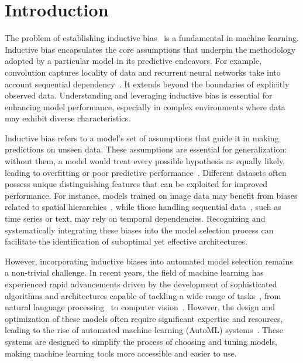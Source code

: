 \documentclass[14pt]{extarticle}
\begin{document}
\section{Introduction} 
The problem of establishing inductive bias~\citep{Mitchell2007TheNF} is a fundamental in  machine learning. Inductive bias encapsulates the core assumptions that underpin the methodology adopted by a particular model in its predictive endeavors. For example, convolution captures locality of data and recurrent neural networks take into account sequential dependency~\citep{cohen2017inductivebiasdeepconvolutional, DUBININ2024106179}. It extends beyond the boundaries of explicitly observed data. Understanding and leveraging inductive bias is essential for enhancing model performance, especially in complex environments where data may exhibit diverse characteristics. 


Inductive bias refers to a model's set of assumptions that guide it in making predictions on unseen data. These assumptions are essential for generalization: without them, a model would treat every possible hypothesis as equally likely, leading to overfitting or poor predictive performance~\citep{Mitchell2007TheNF}. Different datasets often possess unique distinguishing features that can be exploited for improved performance. For instance, models trained on image data may benefit from biases related to spatial hierarchies~\citep{alex_net}, while those handling sequential data~\citep{lstm, Vaswani2017AttentionIA}, such as time series or text, may rely on temporal dependencies. Recognizing and systematically integrating these biases into the model selection process can facilitate the identification of suboptimal yet effective architectures.

However, incorporating inductive biases into automated model selection remains a non-trivial challenge. In recent years, the field of machine learning has experienced rapid advancements driven by the development of sophisticated algorithms and architectures capable of tackling a wide range of tasks~\citep{SHEHAB2022105458, OZBAYOGLU2020106384, ml_in_cv_survey, 10803211}, from natural language processing~\citep{brown2020languagemodelsfewshotlearners} to computer vision~\citep{NIPS2012_c399862d}. However, the design and optimization of these models often require significant expertise and resources, leading to the rise of automated machine learning (AutoML) systems~\citep{He_2021}. These systems are designed to simplify the process of choosing and tuning models, making machine learning tools more accessible and easier to use.
\end{document}
